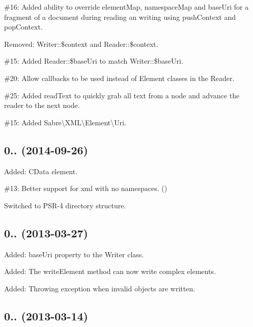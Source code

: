 \begin{DoxyItemize}
\item \#16\+: Added ability to override {\ttfamily element\+Map}, {\ttfamily namespace\+Map} and {\ttfamily base\+Uri} for a fragment of a document during reading an writing using {\ttfamily push\+Context} and {\ttfamily pop\+Context}.
\item Removed\+: {\ttfamily Writer\+::\$context} and {\ttfamily Reader\+::\$context}.
\item \#15\+: Added {\ttfamily Reader\+::\$base\+Uri} to match {\ttfamily Writer\+::\$base\+Uri}.
\item \#20\+: Allow callbacks to be used instead of {\ttfamily Element} classes in the {\ttfamily Reader}.
\item \#25\+: Added {\ttfamily read\+Text} to quickly grab all text from a node and advance the reader to the next node.
\item \#15\+: Added {\ttfamily Sabre\textbackslash{}X\+ML\textbackslash{}Element\textbackslash{}Uri}.
\end{DoxyItemize}

\subsection*{0.. (2014-\/09-\/26) }


\begin{DoxyItemize}
\item Added\+: {\ttfamily C\+Data} element.
\item \#13\+: Better support for xml with no namespaces. ()
\item Switched to P\+S\+R-\/4 directory structure.
\end{DoxyItemize}

\subsection*{0.. (2013-\/03-\/27) }


\begin{DoxyItemize}
\item Added\+: base\+Uri property to the Writer class.
\item Added\+: The write\+Element method can now write complex elements.
\item Added\+: Throwing exception when invalid objects are written.
\end{DoxyItemize}

\subsection*{0.. (2013-\/03-\/14) }


